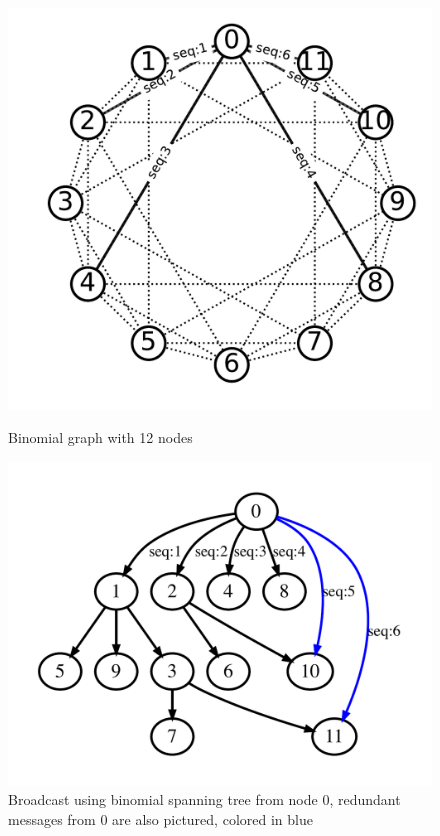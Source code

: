 \documentclass[sigconf]{acmart}
\begin{document}
\begin{figure}[ht!]
  \begin{minipage}{.45\textwidth}
    \centering
    \includegraphics[scale=.3]{BMG_seq.pdf}
    \caption{Binomial graph with 12 nodes}
    \label{fig:bmg}
  \end{minipage}
  \begin{minipage}{.45\textwidth}
    \centering
    \includegraphics[scale=.3]{reorder_span.pdf}
    \caption{Broadcast using binomial spanning tree from node 0, redundant messages from 0 are also pictured, colored in blue}
    \label{fig:reorder_span}
  \end{minipage}
\end{figure}
\end{document}

